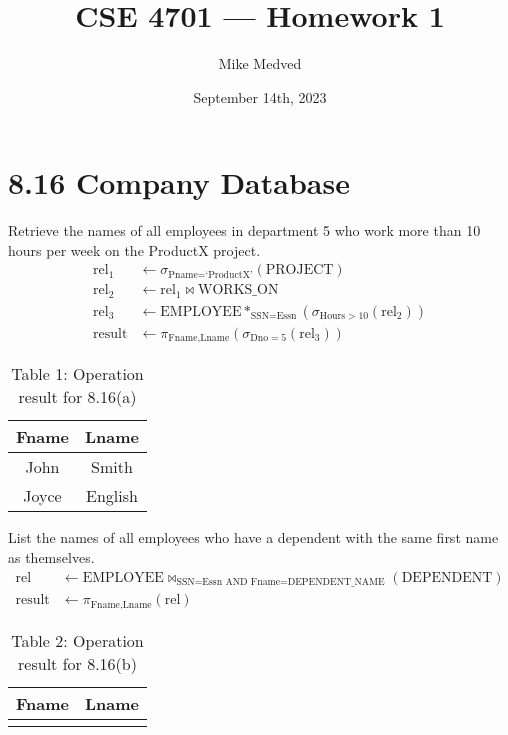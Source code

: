 \documentclass{article}
\title{CSE 4701 — Homework 1}
\author{Mike Medved}
\date{September 14th, 2023}
\begin{document}
\maketitle

\section*{8.16 Company Database}

\begin{parlist}
    \item Retrieve the names of all employees in department 5 who work more than 10 hours per week on the ProductX project.
    \begin{align*}
        \text{rel}_1 &\leftarrow \sigma_{\text{Pname} = \text{`ProductX'}}(\text{PROJECT}) \\
        \text{rel}_2 &\leftarrow \text{rel}_1 \bowtie \text{WORKS\_ON} \\
        \text{rel}_3 &\leftarrow \text{EMPLOYEE} *_{\text{SSN}=\text{Essn}}(\sigma_{\text{Hours} > 10}(\text{rel}_2)) \\
        \text{result} &\leftarrow \pi_{\text{Fname,Lname}}(\sigma_{\text{Dno}=5}(\text{rel}_3))
    \end{align*}

    \begin{table}[h!]
        \centering
        \caption*{Table 1: Operation result for 8.16(a)}
        \begin{tabularx}{0.5\textwidth}{|C|C|}
            \hline \textbf{Fname} & \textbf{Lname} \\ \hline
            John & Smith \\ \hline
            Joyce & English \\ \hline
        \end{tabularx}
    \end{table}

    \item List the names of all employees who have a dependent with the same first name as themselves.
    \begin{align*}
        \text{rel} &\leftarrow \text{EMPLOYEE} \bowtie_{\text{SSN=Essn AND Fname=DEPENDENT\_NAME}}(\text{DEPENDENT}) \\
        \text{result} &\leftarrow \pi_{\text{Fname,Lname}}(\text{rel})
    \end{align*}

    \begin{table}[h!]
        \centering
        \caption*{Table 2: Operation result for 8.16(b)}
        \begin{tabularx}{0.5\textwidth}{|C|C|}
            \hline \textbf{Fname} & \textbf{Lname} \\ \hline
             &  \\ \hline
        \end{tabularx}
    \end{table}


\end{parlist}
\end{document}
